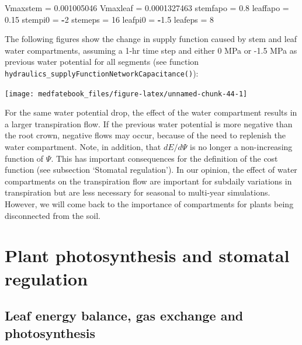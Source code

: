 \documentclass[]{book}
\newenvironment{Shaded}{\begin{snugshade}}{\end{snugshade}}
\newcommand{\DecValTok}[1]{\textcolor[rgb]{0.00,0.00,0.81}{#1}}
\newcommand{\FloatTok}[1]{\textcolor[rgb]{0.00,0.00,0.81}{#1}}
\newcommand{\StringTok}[1]{\textcolor[rgb]{0.31,0.60,0.02}{#1}}
\newcommand{\OperatorTok}[1]{\textcolor[rgb]{0.81,0.36,0.00}{\textbf{#1}}}
\newcommand{\NormalTok}[1]{#1}
\begin{document}
\begin{Shaded}
\begin{Highlighting}[]
\NormalTok{Vmaxstem =}\StringTok{ }\FloatTok{0.001005046}
\NormalTok{Vmaxleaf =}\StringTok{ }\FloatTok{0.0001327463}
\NormalTok{stemfapo =}\StringTok{ }\FloatTok{0.8}
\NormalTok{leaffapo =}\StringTok{ }\FloatTok{0.15}
\NormalTok{stempi0 =}\StringTok{ }\OperatorTok{-}\DecValTok{2}
\NormalTok{stemeps =}\StringTok{ }\DecValTok{16}
\NormalTok{leafpi0 =}\StringTok{ }\OperatorTok{-}\FloatTok{1.5}
\NormalTok{leafeps =}\StringTok{ }\DecValTok{8}
\end{Highlighting}
\end{Shaded}

The following figures show the change in supply function caused by stem
and leaf water compartments, assuming a 1-hr time step and either 0 MPa
or -1.5 MPa as previous water potential for all segments (see function
\texttt{hydraulics\_supplyFunctionNetworkCapacitance()}):

\begin{center}\texttt{[image: medfatebook\_files/figure-latex/unnamed-chunk-44-1]} \end{center}

For the same water potential drop, the effect of the water compartment
results in a larger transpiration flow. If the previous water potential
is more negative than the root crown, negative flows may occur, because
of the need to replenish the water compartment. Note, in addition, that
\(dE/d\Psi\) is no longer a non-increasing function of \(\Psi\). This
has important consequences for the definition of the cost function (see
subsection `Stomatal regulation'). In our opinion, the effect of water
compartments on the transpiration flow are important for subdaily
variations in transpiration but are less necessary for seasonal to
multi-year simulations. However, we will come back to the importance of
compartments for plants being disconnected from the soil.

\chapter{Plant photosynthesis and stomatal
regulation}\label{plant-photosynthesis-and-stomatal-regulation}

\section{Leaf energy balance, gas exchange and
photosynthesis}\label{leaf-energy-balance-gas-exchange-and-photosynthesis}
\end{document}
